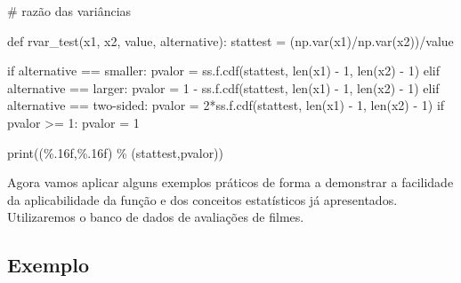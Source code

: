 \documentclass[
  letterpaper,
  DIV=11,
  numbers=noendperiod]{scrreprt}
\newenvironment{Shaded}{\begin{snugshade}}{\end{snugshade}}
\newcommand{\BuiltInTok}[1]{\textcolor[rgb]{0.00,0.23,0.31}{#1}}
\newcommand{\CommentTok}[1]{\textcolor[rgb]{0.37,0.37,0.37}{#1}}
\newcommand{\ControlFlowTok}[1]{\textcolor[rgb]{0.00,0.23,0.31}{#1}}
\newcommand{\DecValTok}[1]{\textcolor[rgb]{0.68,0.00,0.00}{#1}}
\newcommand{\KeywordTok}[1]{\textcolor[rgb]{0.00,0.23,0.31}{#1}}
\newcommand{\NormalTok}[1]{\textcolor[rgb]{0.00,0.23,0.31}{#1}}
\newcommand{\OperatorTok}[1]{\textcolor[rgb]{0.37,0.37,0.37}{#1}}
\newcommand{\SpecialCharTok}[1]{\textcolor[rgb]{0.37,0.37,0.37}{#1}}
\newcommand{\StringTok}[1]{\textcolor[rgb]{0.13,0.47,0.30}{#1}}
\begin{document}
\begin{Shaded}
\begin{Highlighting}[]
\CommentTok{\# razão das variâncias}

\KeywordTok{def}\NormalTok{ rvar\_test(x1, x2, value, alternative):}
\NormalTok{    stattest }\OperatorTok{=}\NormalTok{ (np.var(x1)}\OperatorTok{/}\NormalTok{np.var(x2))}\OperatorTok{/}\NormalTok{value}
    
    \ControlFlowTok{if}\NormalTok{ alternative }\OperatorTok{==} \StringTok{\textquotesingle{}smaller\textquotesingle{}}\NormalTok{:}
\NormalTok{        pvalor }\OperatorTok{=}\NormalTok{ ss.f.cdf(stattest, }\BuiltInTok{len}\NormalTok{(x1) }\OperatorTok{{-}} \DecValTok{1}\NormalTok{, }\BuiltInTok{len}\NormalTok{(x2) }\OperatorTok{{-}} \DecValTok{1}\NormalTok{)}
    \ControlFlowTok{elif}\NormalTok{ alternative }\OperatorTok{==} \StringTok{\textquotesingle{}larger\textquotesingle{}}\NormalTok{:}
\NormalTok{        pvalor }\OperatorTok{=} \DecValTok{1} \OperatorTok{{-}}\NormalTok{ ss.f.cdf(stattest, }\BuiltInTok{len}\NormalTok{(x1) }\OperatorTok{{-}} \DecValTok{1}\NormalTok{, }\BuiltInTok{len}\NormalTok{(x2) }\OperatorTok{{-}} \DecValTok{1}\NormalTok{)}
    \ControlFlowTok{elif}\NormalTok{ alternative }\OperatorTok{==} \StringTok{\textquotesingle{}two{-}sided\textquotesingle{}}\NormalTok{:}
\NormalTok{        pvalor }\OperatorTok{=} \DecValTok{2}\OperatorTok{*}\NormalTok{ss.f.cdf(stattest, }\BuiltInTok{len}\NormalTok{(x1) }\OperatorTok{{-}} \DecValTok{1}\NormalTok{, }\BuiltInTok{len}\NormalTok{(x2) }\OperatorTok{{-}} \DecValTok{1}\NormalTok{)}
        \ControlFlowTok{if}\NormalTok{ pvalor }\OperatorTok{\textgreater{}=} \DecValTok{1}\NormalTok{:}
\NormalTok{            pvalor }\OperatorTok{=} \DecValTok{1}
        
    \BuiltInTok{print}\NormalTok{(}\StringTok{\textquotesingle{}(}\SpecialCharTok{\%.16f}\StringTok{,}\SpecialCharTok{\%.16f}\StringTok{)\textquotesingle{}} \OperatorTok{\%}\NormalTok{ (stattest,pvalor)) }
\end{Highlighting}
\end{Shaded}

Agora vamos aplicar alguns exemplos práticos de forma a demonstrar a
facilidade da aplicabilidade da função e dos conceitos estatísticos já
apresentados. Utilizaremos o banco de dados de avaliações de filmes.

\hypertarget{exemplo}{%
\subsection{Exemplo}\label{exemplo}}
\end{document}
